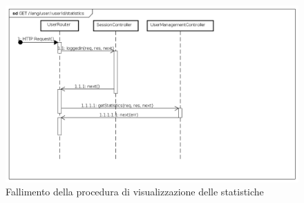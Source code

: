 \begin{itemize}
\label{Fallimento della procedura di visualizzazione delle statistiche}
\begin{figure}[ht]
	\centering
	\includegraphics[scale=0.40]{UML/DiagrammiDiSequenza/Back-end/GET_LangUserUserIdStatisticsFailure.png}
	\caption{Fallimento della procedura di visualizzazione delle statistiche}
\end{figure}
\FloatBarrier
\end{itemize}

